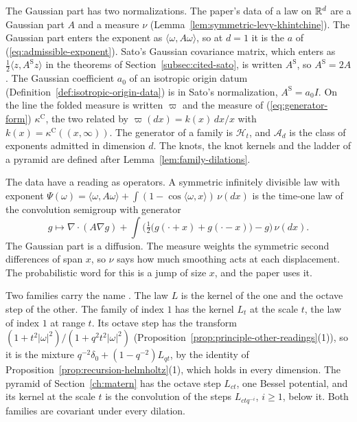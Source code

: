 The Gaussian part has two normalizations. The paper's \Levy{} data of a
law on $\mathbb{R}^d$ are a Gaussian part $A$ and a \Levy{} measure $\nu$
(Lemma~\ref{lem:symmetric-levy-khintchine}). The Gaussian part enters the exponent as
$\langle\omega, A\omega\rangle$, so at $d = 1$ it is the $a$ of (\ref{eq:admissible-exponent}). Sato's Gaussian covariance matrix, which enters as
$\tfrac12\langle z, A^{\mathrm S}z\rangle$ in the theorems of Section~\ref{subsec:cited-sato}, is
written $A^{\mathrm S}$, so $A^{\mathrm S} = 2A$. The Gaussian coefficient $a_0$ of an isotropic
origin datum (Definition~\ref{def:isotropic-origin-data}) is in Sato's normalization,
$A^{\mathrm S} = a_0I$. On the line the folded \Levy{} measure is written $\varpi$
and the measure of (\ref{eq:generator-form}) $\kappa^{\mathrm C}$, the two related by
$\varpi(dx) = k(x)\,dx/x$ with $k(x) = \kappa^{\mathrm C}((x,\infty))$. The generator of a family
is $\mathcal{H}_t$, and $\mathcal{A}_d$ is the class of exponents admitted in dimension $d$. The
knots, the knot kernels and the ladder of a pyramid are defined after
Lemma~\ref{lem:family-dilations}.

The \Levy{} data have a reading as operators. A symmetric infinitely divisible law with exponent
$\Psi(\omega) = \langle\omega, A\omega\rangle + \int(1 - \cos\langle\omega, x\rangle)\,\nu(dx)$ is
the time-one law of the convolution semigroup with generator
\[
  g \mapsto \nabla\cdot(A\nabla g) + \int \Big(\tfrac12\big(g(\cdot + x) + g(\cdot - x)\big) - g\Big)\,\nu(dx).
\]
The Gaussian part is a diffusion. The \Levy{} measure weights the symmetric second differences of
span $x$, so $\nu$ says how much smoothing acts at each displacement. The probabilistic word for this
is a jump of size $x$, and the paper uses it.

Two families carry the name \Matern{}. The law $L$ is the kernel of the one and the octave step of
the other. The \Matern{} family of index $1$ has the kernel $L_t$ at the scale $t$, the \Matern{}
law of index $1$ at range $t$. Its octave step has the transform
$(1 + t^2|\omega|^2)/(1 + q^2t^2|\omega|^2)$ (Proposition~\ref{prop:principle-other-readings}(1)),
so it is the mixture $q^{-2}\delta_0 + (1 - q^{-2})L_{qt}$, by the identity of
Proposition~\ref{prop:recursion-helmholtz}(1), which holds in every dimension.
The \Matern{} pyramid of Section~\ref{ch:matern} has the octave step $L_{ct}$, one Bessel potential,
and its kernel at the scale $t$ is the convolution of the steps $L_{ctq^{-i}}$, $i \ge 1$, below
it. Both families are covariant under every dilation.

